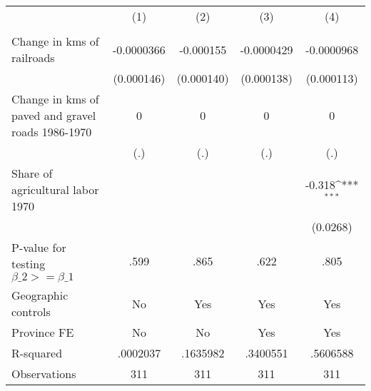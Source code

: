 {
\def\sym#1{\ifmmode^{#1}\else\(^{#1}\)\fi}
\begin{tabular}{l*{4}{c}}
\hline\hline
                &\multicolumn{1}{c}{(1)}&\multicolumn{1}{c}{(2)}&\multicolumn{1}{c}{(3)}&\multicolumn{1}{c}{(4)}\\
                &\multicolumn{1}{c}{}&\multicolumn{1}{c}{}&\multicolumn{1}{c}{}&\multicolumn{1}{c}{}\\
\hline
Change in kms of railroads&-0.0000366         &-0.000155         &-0.0000429         &-0.0000968         \\
                &(0.000146)         &(0.000140)         &(0.000138)         &(0.000113)         \\
[1em]
Change in kms of paved and gravel roads 1986-1970&        0         &        0         &        0         &        0         \\
                &      (.)         &      (.)         &      (.)         &      (.)         \\
[1em]
Share of agricultural labor 1970&                  &                  &                  &   -0.318\sym{***}\\
                &                  &                  &                  & (0.0268)         \\
\hline
P-value for testing $\beta\_{2} >= \beta\_{1}$&     .599         &     .865         &     .622         &     .805         \\
Geographic controls&       No         &      Yes         &      Yes         &      Yes         \\
Province FE     &       No         &       No         &      Yes         &      Yes         \\
R-squared       & .0002037         & .1635982         & .3400551         & .5606588         \\
Observations    &      311         &      311         &      311         &      311         \\
\hline\hline
\end{tabular}
}
